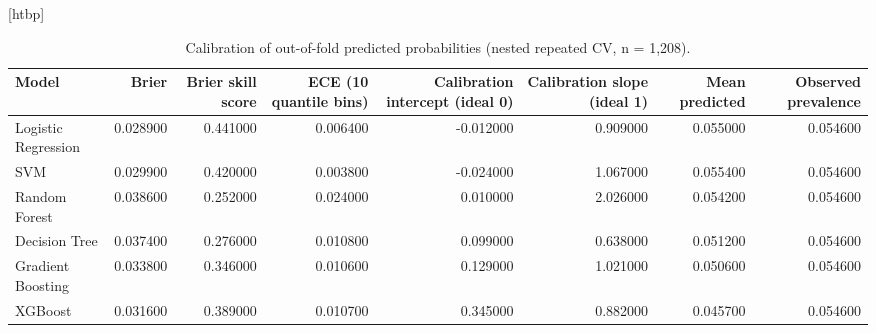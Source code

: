 \begin{table}
\small[htbp]
\caption{Calibration of out-of-fold predicted probabilities (nested repeated CV, n = 1,208).}
\label{tab:S20_calibration}
\begin{tabular}{lrrrrrrr}
\toprule
Model & Brier & Brier skill score & ECE (10 quantile bins) & Calibration intercept (ideal 0) & Calibration slope (ideal 1) & Mean predicted & Observed prevalence \\
\midrule
Logistic Regression & 0.028900 & 0.441000 & 0.006400 & -0.012000 & 0.909000 & 0.055000 & 0.054600 \\
SVM & 0.029900 & 0.420000 & 0.003800 & -0.024000 & 1.067000 & 0.055400 & 0.054600 \\
Random Forest & 0.038600 & 0.252000 & 0.024000 & 0.010000 & 2.026000 & 0.054200 & 0.054600 \\
Decision Tree & 0.037400 & 0.276000 & 0.010800 & 0.099000 & 0.638000 & 0.051200 & 0.054600 \\
Gradient Boosting & 0.033800 & 0.346000 & 0.010600 & 0.129000 & 1.021000 & 0.050600 & 0.054600 \\
XGBoost & 0.031600 & 0.389000 & 0.010700 & 0.345000 & 0.882000 & 0.045700 & 0.054600 \\
\bottomrule
\end{tabular}
\end{table}
